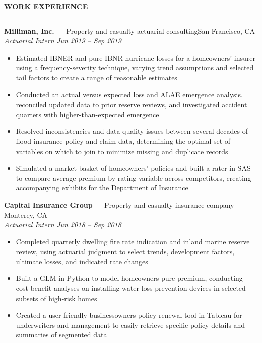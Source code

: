 \documentclass[11pt,letterpaper]{article}
\newcommand{\sectline}{\vspace{4pt}\hrule height 1.5pt\vspace{4pt}}
\newcommand{\smallspace}{\vspace{5pt}}
\begin{document}
\textbf{WORK EXPERIENCE}\sectline
\textbf{Milliman, Inc.} --- Property and casualty actuarial consulting\hfill San Francisco, CA \\
\textit{Actuarial Intern} \hfill \textit{Jun 2019 -- Sep 2019}
\begin{itemize}
	\item Estimated IBNER and pure IBNR hurricane losses for a homeowners' insurer using a frequency-severity technique, varying trend assumptions and selected tail factors to create a range of reasonable estimates
	\item Conducted an actual versus expected loss and ALAE emergence analysis, reconciled updated data to prior reserve reviews, and investigated accident quarters with higher-than-expected emergence 
	\item Resolved inconsistencies and data quality issues between several decades of flood insurance policy and claim data, determining the optimal set of variables on which to join to minimize missing and duplicate records 
	\item Simulated a market basket of homeowners' policies and built a rater in SAS to compare average premium by rating variable across competitors, creating accompanying exhibits for the 	Department of Insurance
\end{itemize}
\smallspace 
\textbf{Capital Insurance Group} --- Property and casualty insurance company \hfill Monterey, CA \\
\textit{Actuarial Intern} \hfill \textit{Jun 2018 -- Sep 2018}
\begin{itemize}
	\item Completed quarterly dwelling fire rate indication and inland marine reserve review, using actuarial judgment to select trends, development factors, ultimate losses, and indicated rate changes
	\item Built a GLM in Python to model homeowners pure premium, conducting cost-benefit analyses on installing water loss prevention devices in selected subsets of high-risk homes 
	\item Created a user-friendly businessowners policy renewal tool in Tableau for underwriters and management to easily retrieve specific policy details and summaries of segmented data	
\end{itemize}
\end{document}
